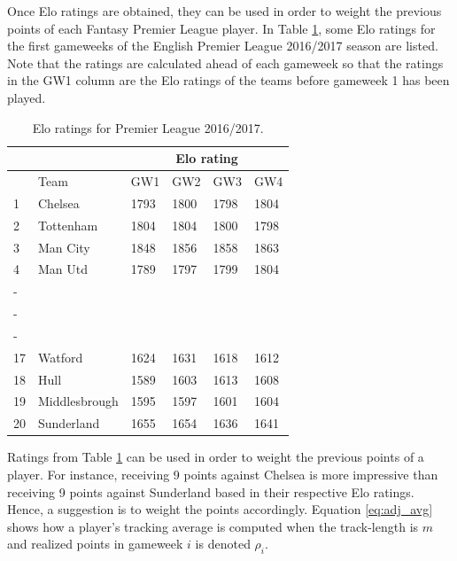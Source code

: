 \newpar


Once Elo ratings are obtained, they can be used in order to weight the previous points of each Fantasy Premier League player. In Table \ref{Elo.1617}, some Elo ratings for the first gameweeks of the English Premier League 2016/2017 season are listed. Note that the ratings are calculated ahead of each gameweek so that the ratings in the GW1 column are the Elo ratings of the teams before gameweek 1 has been played. 

\begin{table}[H]
\centering
\begin{tabular}{|l|l|l|l|l|l|}
\cline{2-6}
\multicolumn{1}{l|}{} & \multicolumn{1}{l|}{} & \multicolumn{4}{c|}{Elo rating}  \\ \cline{2-6} 
\hline
                      & Team                  & GW1    & GW2    & GW3  & GW4    \\
                      \hline
1                     & \Tstrut Chelsea               & 1793   & 1800   & 1798 & 1804   \\
2                     & Tottenham             & 1804   & 1804   & 1800 & 1798   \\
3                     & Man City              & 1848   & 1856   & 1858 & 1863   \\
4                     & Man Utd               & 1789   & 1797   & 1799 & 1804   \\
-                     &                       &        &        &      &        \\
-                     &                       &        &        &      &        \\
-                     &                       &        &        &      &        \\
17                    & Watford               & 1624   & 1631   & 1618 & 1612   \\
18                    & Hull                  & 1589   & 1603   & 1613 & 1608   \\
19                    & Middlesbrough         & 1595   & 1597   & 1601 & 1604   \\
20                    & Sunderland  \Bstrut          & 1655   & 1654   & 1636 & 1641   \\
\hline
\end{tabular}
\caption{Elo ratings for Premier League 2016/2017.}
\label{Elo.1617}
\end{table}


Ratings from Table \ref{Elo.1617} can be used in order to weight the previous points of a player. For instance, receiving 9 points against Chelsea is more impressive than receiving 9 points against Sunderland based in their respective Elo ratings. Hence, a suggestion is to weight the points accordingly. Equation \ref{eq:adj_avg} shows how a player's tracking average is computed when the track-length is $m$ and realized points in gameweek $i$ is denoted $\rho_i$. 

